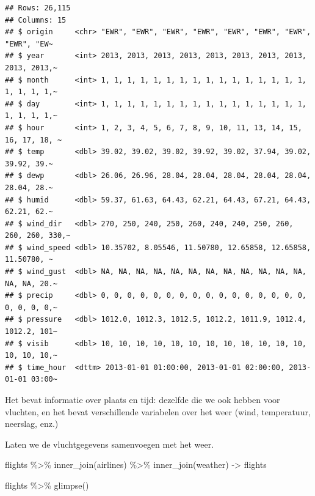 \documentclass[]{tufte-book}
\newenvironment{Shaded}{}{}
\newcommand{\FunctionTok}[1]{\textcolor[rgb]{0.02,0.16,0.49}{#1}}
\newcommand{\NormalTok}[1]{#1}
\newcommand{\OtherTok}[1]{\textcolor[rgb]{0.00,0.44,0.13}{#1}}
\newcommand{\SpecialCharTok}[1]{\textcolor[rgb]{0.25,0.44,0.63}{#1}}
\begin{document}
\begin{verbatim}
## Rows: 26,115
## Columns: 15
## $ origin     <chr> "EWR", "EWR", "EWR", "EWR", "EWR", "EWR", "EWR", "EWR", "EW~
## $ year       <int> 2013, 2013, 2013, 2013, 2013, 2013, 2013, 2013, 2013, 2013,~
## $ month      <int> 1, 1, 1, 1, 1, 1, 1, 1, 1, 1, 1, 1, 1, 1, 1, 1, 1, 1, 1, 1,~
## $ day        <int> 1, 1, 1, 1, 1, 1, 1, 1, 1, 1, 1, 1, 1, 1, 1, 1, 1, 1, 1, 1,~
## $ hour       <int> 1, 2, 3, 4, 5, 6, 7, 8, 9, 10, 11, 13, 14, 15, 16, 17, 18, ~
## $ temp       <dbl> 39.02, 39.02, 39.02, 39.92, 39.02, 37.94, 39.02, 39.92, 39.~
## $ dewp       <dbl> 26.06, 26.96, 28.04, 28.04, 28.04, 28.04, 28.04, 28.04, 28.~
## $ humid      <dbl> 59.37, 61.63, 64.43, 62.21, 64.43, 67.21, 64.43, 62.21, 62.~
## $ wind_dir   <dbl> 270, 250, 240, 250, 260, 240, 240, 250, 260, 260, 260, 330,~
## $ wind_speed <dbl> 10.35702, 8.05546, 11.50780, 12.65858, 12.65858, 11.50780, ~
## $ wind_gust  <dbl> NA, NA, NA, NA, NA, NA, NA, NA, NA, NA, NA, NA, NA, NA, 20.~
## $ precip     <dbl> 0, 0, 0, 0, 0, 0, 0, 0, 0, 0, 0, 0, 0, 0, 0, 0, 0, 0, 0, 0,~
## $ pressure   <dbl> 1012.0, 1012.3, 1012.5, 1012.2, 1011.9, 1012.4, 1012.2, 101~
## $ visib      <dbl> 10, 10, 10, 10, 10, 10, 10, 10, 10, 10, 10, 10, 10, 10, 10,~
## $ time_hour  <dttm> 2013-01-01 01:00:00, 2013-01-01 02:00:00, 2013-01-01 03:00~
\end{verbatim}

Het bevat informatie over plaats en tijd: dezelfde die we ook hebben voor vluchten, en het bevat verschillende variabelen over het weer (wind, temperatuur, neerslag, enz.)

Laten we de vluchtgegevens samenvoegen met het weer.

\begin{Shaded}
\begin{Highlighting}[]
\NormalTok{flights }\SpecialCharTok{\%\textgreater{}\%}
  \FunctionTok{inner\_join}\NormalTok{(airlines) }\SpecialCharTok{\%\textgreater{}\%}
  \FunctionTok{inner\_join}\NormalTok{(weather) }\OtherTok{{-}\textgreater{}}\NormalTok{ flights}

\NormalTok{flights }\SpecialCharTok{\%\textgreater{}\%}
  \FunctionTok{glimpse}\NormalTok{()}
\end{Highlighting}
\end{Shaded}
\end{document}
